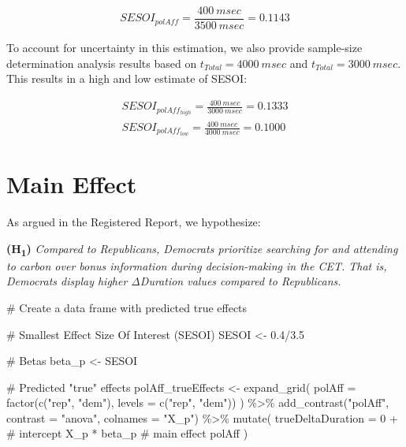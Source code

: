 \documentclass[
  letterpaper,
  DIV=11,
  numbers=noendperiod]{scrartcl}
\newenvironment{Shaded}{\begin{snugshade}}{\end{snugshade}}
\newcommand{\AttributeTok}[1]{\textcolor[rgb]{0.40,0.45,0.13}{#1}}
\newcommand{\CommentTok}[1]{\textcolor[rgb]{0.37,0.37,0.37}{#1}}
\newcommand{\DecValTok}[1]{\textcolor[rgb]{0.68,0.00,0.00}{#1}}
\newcommand{\FloatTok}[1]{\textcolor[rgb]{0.68,0.00,0.00}{#1}}
\newcommand{\FunctionTok}[1]{\textcolor[rgb]{0.28,0.35,0.67}{#1}}
\newcommand{\NormalTok}[1]{\textcolor[rgb]{0.00,0.23,0.31}{#1}}
\newcommand{\OtherTok}[1]{\textcolor[rgb]{0.00,0.23,0.31}{#1}}
\newcommand{\SpecialCharTok}[1]{\textcolor[rgb]{0.37,0.37,0.37}{#1}}
\newcommand{\StringTok}[1]{\textcolor[rgb]{0.13,0.47,0.30}{#1}}
\begin{document}
\[
SESOI_{polAff} = \frac{400\ msec}{3500\ msec} = 0.1143
\]

To account for uncertainty in this estimation, we also provide
sample-size determination analysis results based on
\(t_{Total} = 4000\ msec\) and \(t_{Total} = 3000\ msec\). This results
in a high and low estimate of SESOI:

\[
\begin{split}
SESOI_{polAff_{high}} = \frac{400\ msec}{3000\ msec} = 0.1333 \\
SESOI_{polAff_{low}} = \frac{400\ msec}{4000\ msec} = 0.1000
\end{split}
\]

\section{Main Effect}\label{main-effect}

As argued in the Registered Report, we hypothesize:

\textbf{(H\textsubscript{1})} \emph{Compared to Republicans, Democrats
prioritize searching for and attending to carbon over bonus information
during decision-making in the CET. That is, Democrats display higher
ΔDuration values compared to Republicans.}

\begin{Shaded}
\begin{Highlighting}[]
\CommentTok{\# Create a data frame with predicted true effects}

\CommentTok{\# Smallest Effect Size Of Interest (SESOI)}
\NormalTok{SESOI }\OtherTok{\textless{}{-}} \FloatTok{0.4}\SpecialCharTok{/}\FloatTok{3.5}

\CommentTok{\# Betas}
\NormalTok{beta\_p }\OtherTok{\textless{}{-}}\NormalTok{ SESOI}

\CommentTok{\# Predicted "true" effects}
\NormalTok{polAff\_trueEffects }\OtherTok{\textless{}{-}} \FunctionTok{expand\_grid}\NormalTok{(}
  \AttributeTok{polAff =} \FunctionTok{factor}\NormalTok{(}\FunctionTok{c}\NormalTok{(}\StringTok{"rep"}\NormalTok{, }\StringTok{"dem"}\NormalTok{), }\AttributeTok{levels =} \FunctionTok{c}\NormalTok{(}\StringTok{"rep"}\NormalTok{, }\StringTok{"dem"}\NormalTok{))}
\NormalTok{) }\SpecialCharTok{\%\textgreater{}\%} 
  \FunctionTok{add\_contrast}\NormalTok{(}\StringTok{"polAff"}\NormalTok{, }\AttributeTok{contrast =} \StringTok{"anova"}\NormalTok{, }\AttributeTok{colnames =} \StringTok{"X\_p"}\NormalTok{) }\SpecialCharTok{\%\textgreater{}\%} 
  \FunctionTok{mutate}\NormalTok{(}
    \AttributeTok{trueDeltaDuration =}
      \DecValTok{0} \SpecialCharTok{+}         \CommentTok{\# intercept}
\NormalTok{      X\_p }\SpecialCharTok{*}\NormalTok{ beta\_p }\CommentTok{\# main effect polAff}
\NormalTok{  )}
\end{Highlighting}
\end{Shaded}
\end{document}

